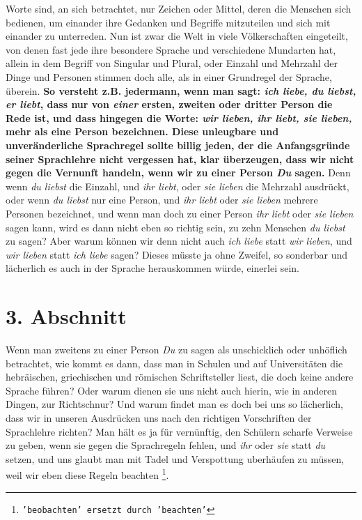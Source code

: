  Worte sind, an sich betrachtet, nur Zeichen oder
Mittel, deren die Menschen sich
bedienen, um einander ihre Gedanken und Begriffe mitzuteilen und sich mit
einander zu unterreden. Nun ist zwar die Welt in viele Völkerschaften
eingeteilt, von denen fast jede ihre besondere Sprache und verschiedene
Mundarten hat, allein in dem Begriff von Singular und Plural, oder
Einzahl und Mehrzahl der Dinge und Personen stimmen doch alle, als in
einer Grundregel der Sprache, überein. \textbf{So versteht z.B. jedermann, wenn
man
sagt: \textit{ich liebe, du liebst, er liebt}, dass nur von \textit{einer}
ersten, zweiten
oder dritter Person die Rede ist, und dass hingegen die Worte: \textit{wir
lieben, ihr
liebt, sie lieben,} mehr als eine Person bezeichnen. Diese unleugbare und
unveränderliche Sprachregel sollte billig jeden, der die Anfangsgründe seiner
Sprachlehre nicht vergessen hat, klar überzeugen, dass wir nicht gegen die
Vernunft handeln, wenn wir zu einer Person \textit{Du} sagen.} Denn wenn
\textit{du
liebst} die Einzahl, und \textit{ihr liebt}, oder \textit{sie lieben} die
Mehrzahl
ausdrückt, oder wenn \textit{du liebst} nur eine Person, und \textit{ihr
liebt} oder
\textit{sie lieben} mehrere Personen bezeichnet, und wenn man doch zu einer
Person
\textit{ihr liebt} oder \textit{sie lieben} sagen kann, wird es dann nicht eben
so
richtig sein, zu zehn Menschen \textit{du liebst} zu sagen? Aber warum können
wir
denn nicht auch \textit{ich liebe} statt \textit{wir lieben}, und \textit{wir
lieben} statt
\textit{ich liebe} sagen? Dieses müsste ja ohne Zweifel, so sonderbar und
lächerlich
es auch in der Sprache herauskommen würde, einerlei sein.

\section{3. Abschnitt} \label{kap10_ab3}

Wenn man zweitens zu einer Person \textit{Du} zu sagen als unschicklich oder
unhöflich betrachtet, wie kommt es dann, dass man in Schulen und auf
Universitäten die hebräischen, griechischen und römischen Schriftsteller liest,
die doch keine andere Sprache führen? Oder warum dienen sie uns nicht auch
hierin, wie in anderen Dingen, zur Richtschnur? Und warum findet man es doch bei
uns so lächerlich, dass wir in unseren Ausdrücken uns nach den richtigen
Vorschriften der Sprachlehre richten? Man hält es ja für vernünftig, den
Schülern scharfe Verweise zu geben, wenn sie gegen die Sprachregeln fehlen, und
\textit{ihr} oder \textit{sie} statt \textit{du} setzen, und uns glaubt man mit
Tadel und Verspottung
uberhäufen zu müssen, weil wir eben diese Regeln beachten
\footnote{\texttt{'beobachten' ersetzt durch 'beachten'}}.

